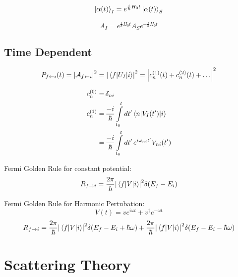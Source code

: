 \documentclass[a4paper, twocolumn]{article}
\begin{document}
\begin{equation*}
    \ket{\alpha(t)}_{I} = e^{\frac{i}{\hbar} H_0 t} \ket{\alpha(t)}_{S}
\end{equation*}

\begin{equation*}
    A_{I} = e^{\frac{i}{\hbar} H_0 t} A_{S} e^{- \frac{i}{\hbar} H_0 t}
\end{equation*}

\subsection{Time Dependent}

\begin{equation*}
    P_{f \leftarrow i} (t)
        = \abs{ \mathcal{A}_{f \leftarrow i} }^2
        = \abs{ \mel{f}{U_{I}}{i} }^2
        = \abs{ c_n^{(1)}(t) + c_n^{(2)}(t) + \dots }^2
\end{equation*}

\begin{align*}
    c_n^{(0)} =& \,\delta_{ni} \\
    c_n^{(1)} =& \,\frac{-i}{\hbar} \int\limits_{t_0}^{t} dt^{\prime} \mel{n}{V_{I}(t^{\prime})}{i} \\
    =& \, \frac{-i}{\hbar} \int\limits_{t_0}^{t} dt^{\prime} \, e^{i \omega_{n i}t^{\prime}} V_{ni}(t^{\prime}) \\
\end{align*}

Fermi Golden Rule for constant potential:
\begin{equation*}
    R_{f \rightarrow i} = \frac{2 \pi}{\hbar} \abs{ \mel{f}{V}{i} }^2 \delta(E_f - E_i)
\end{equation*}


Fermi Golden Rule for Harmonic Pertubation:
\begin{equation*}
    V(t) = v e^{i \omega t} + v^{\dagger} e^{- \omega t}
\end{equation*}
\begin{equation*}
    R_{f \rightarrow i} =
    \frac{2 \pi}{\hbar} \abs{ \mel{f}{V}{i} }^2 \delta(E_f - E_i + \hbar \omega)
    + \frac{2 \pi}{\hbar} \abs{ \mel{f}{V}{i} }^2 \delta(E_f - E_i - \hbar \omega)
\end{equation*}


\section{Scattering Theory}
\end{document}
